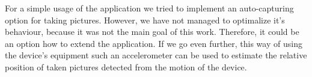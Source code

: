 For a simple usage of the application we tried to implement an auto-capturing option for taking pictures.
However, we have not managed to optimalize it's behaviour, because it was not the main goal of this work. 
Therefore, it could be an option how to extend the application.
If we go even further, this way of using the device's equipment such an accelerometer can be used to estimate the relative position of taken pictures detected from the motion of the device.

